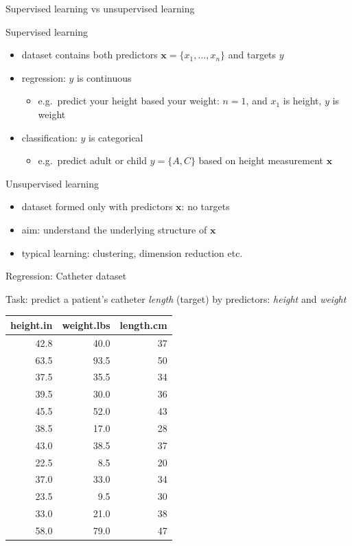\documentclass[ignorenonframetext,]{beamer}
\providecommand{\tightlist}{%
  \setlength{\itemsep}{0pt}\setlength{\parskip}{0pt}}
\newcommand{\vv}[1]{\boldsymbol{#1}}
\begin{document}
\begin{frame}{Supervised learning vs unsupervised learning}
\protect\hypertarget{supervised-learning-vs-unsupervised-learning}{}

Supervised learning

\begin{itemize}
\tightlist
\item
  dataset contains both predictors \(\vv{x} = \{x_1, \ldots, x_n\}\) and
  targets \({y}\)
\item
  regression: \(y\) is continuous

  \begin{itemize}
  \tightlist
  \item
    e.g.~predict your height based your weight: \(n=1\), and \(x_1\) is
    height, \(y\) is weight
  \end{itemize}
\item
  classification: \(y\) is categorical

  \begin{itemize}
  \tightlist
  \item
    e.g.~predict adult or child \(y=\{A, C\}\) based on height
    measurement \(\vv{x}\)
  \end{itemize}
\end{itemize}

\bigskip

Unsupervised learning

\begin{itemize}
\tightlist
\item
  dataset formed only with predictors \(\vv{x}\): no targets
\item
  aim: understand the underlying structure of \(\vv{x}\)
\item
  typical learning: clustering, dimension reduction etc.
\end{itemize}

\end{frame}

\begin{frame}{Regression: Catheter dataset}
\protect\hypertarget{regression-catheter-dataset}{}

Task: predict a patient's catheter \emph{length} (target) by predictors:
\emph{height} and \emph{weight} \vspace{-0.2cm} \footnotesize

\begin{longtable}[]{@{}rrr@{}}
\toprule
height.in & weight.lbs & length.cm\tabularnewline
\midrule
\endhead
42.8 & 40.0 & 37\tabularnewline
63.5 & 93.5 & 50\tabularnewline
37.5 & 35.5 & 34\tabularnewline
39.5 & 30.0 & 36\tabularnewline
45.5 & 52.0 & 43\tabularnewline
38.5 & 17.0 & 28\tabularnewline
43.0 & 38.5 & 37\tabularnewline
22.5 & 8.5 & 20\tabularnewline
37.0 & 33.0 & 34\tabularnewline
23.5 & 9.5 & 30\tabularnewline
33.0 & 21.0 & 38\tabularnewline
58.0 & 79.0 & 47\tabularnewline
\bottomrule
\end{longtable}

\end{frame}
\end{document}
